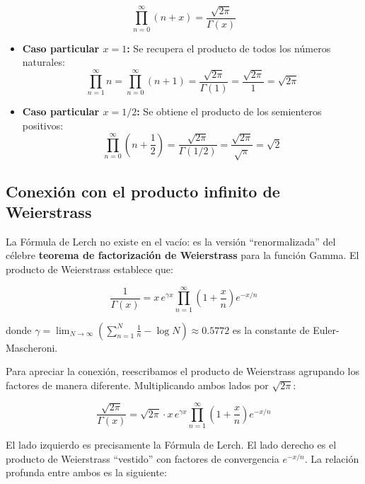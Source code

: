 $$ \boxed{\prod_{n=0}^{\infty} (n+x) = \frac{\sqrt{2\pi}}{\Gamma(x)}} $$

\begin{itemize}
    \item \textbf{Caso particular $x=1$:} Se recupera el producto de todos los números naturales:
    $$ \prod_{n=1}^{\infty} n = \prod_{n=0}^{\infty} (n+1) = \frac{\sqrt{2\pi}}{\Gamma(1)} = \frac{\sqrt{2\pi}}{1} = \sqrt{2\pi} $$
    
    \item \textbf{Caso particular $x=1/2$:} Se obtiene el producto de los semienteros positivos:
    $$ \prod_{n=0}^{\infty} \left(n + \frac{1}{2}\right) = \frac{\sqrt{2\pi}}{\Gamma(1/2)} = \frac{\sqrt{2\pi}}{\sqrt{\pi}} = \sqrt{2} $$
\end{itemize}

\subsection{Conexión con el producto infinito de Weierstrass}

La Fórmula de Lerch no existe en el vacío: es la versión ``renormalizada'' del célebre \textbf{teorema de factorización de Weierstrass} para la función Gamma. El producto de Weierstrass establece que:

$$ \frac{1}{\Gamma(x)} = x \, e^{\gamma x} \prod_{n=1}^{\infty} \left(1 + \frac{x}{n}\right) e^{-x/n} $$

donde $\gamma = \lim_{N \to \infty} \left(\sum_{n=1}^{N} \frac{1}{n} - \log N\right) \approx 0.5772$ es la constante de Euler-Mascheroni. 

Para apreciar la conexión, reescribamos el producto de Weierstrass agrupando los factores de manera diferente. Multiplicando ambos lados por $\sqrt{2\pi}$:

$$ \frac{\sqrt{2\pi}}{\Gamma(x)} = \sqrt{2\pi} \cdot x \, e^{\gamma x} \prod_{n=1}^{\infty} \left(1 + \frac{x}{n}\right) e^{-x/n} $$

El lado izquierdo es precisamente la Fórmula de Lerch. El lado derecho es el producto de Weierstrass ``vestido'' con factores de convergencia $e^{-x/n}$. La relación profunda entre ambos es la siguiente:

